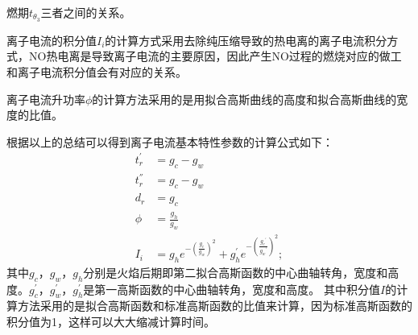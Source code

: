 燃期$t_{\theta_3}$三者之间的关系。\par
离子电流的积分值$I_i$的计算方式采用去除纯压缩导致的热电离的离子电流积分方式，NO热电离是导致离子电流的主要原因，因此产生NO过程的燃烧对应的做工和离子电流积分值会有对应的关系。\par
离子电流升功率$\phi$的计算方法采用的是用拟合高斯曲线的高度和拟合高斯曲线的宽度的比值。\par
根据以上的总结可以得到离子电流基本特性参数的计算公式如下：
\begin{align}
	t_{r}^{'} &= g_{c}-g_{w}\\
	t_{r}^{''} &= g_{c}-g_{w}\\
	d_{r} &= g_{c}\\
	\phi &= \frac{g_{h}}{g_{w}}\\
	I_{i} &= g_{h}e^{-(\frac{g_c}{g_w})^2}+g_{h}^{'}e^{-(\frac{{g_c}^{'}}{{g_w}^{'}})^2};
\end{align}
其中$g_{c}$，$g_w$，$g_h$分别是火焰后期即第二拟合高斯函数的中心曲轴转角，宽度和高度。$g_{c}^{'}$，$g_w^{'}$，$g_h^{'}$是第一高斯函数的中心曲轴转角，宽度和高度。
其中积分值$I$的计算方法采用的是拟合高斯函数和标准高斯函数的比值来计算，因为标准高斯函数的积分值为1，这样可以大大缩减计算时间。
